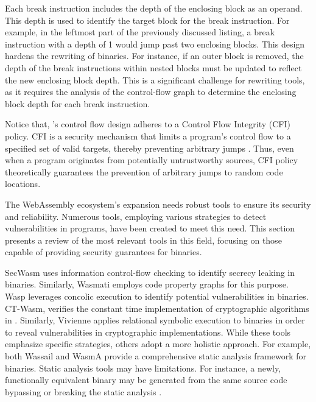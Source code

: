 

Each break instruction includes the depth of the enclosing block as an operand. 
This depth is used to identify the target block for the break instruction. 
For example, in the leftmost part of the previously discussed listing, a break instruction with a depth of 1 would jump past two enclosing blocks.
This design hardens the rewriting of \Wasm binaries.
For instance, if an outer block is removed, the depth of the break instructions within nested blocks must be updated to reflect the new enclosing block depth.
This is a significant challenge for rewriting tools, as it requires the analysis of the control-flow graph to determine the enclosing block depth for each break instruction.

Notice that, \Wasm's control flow design adheres to a Control Flow Integrity (CFI) policy. 
CFI is a security mechanism that limits a program's control flow to a specified set of valid targets, thereby preventing arbitrary jumps \cite{cfi}.
Thus, even when a \Wasm program originates from potentially untrustworthy sources, CFI policy theoretically guarantees the prevention of arbitrary jumps to random code locations.


\label{background:wasm:analysis}

The WebAssembly ecosystem's expansion needs robust tools to ensure its security and reliability. 
Numerous tools, employing various strategies to detect vulnerabilities in \Wasm programs, have been created to meet this need. 
This section presents a review of the most relevant tools in this field, focusing on those capable of providing security guarantees for \Wasm binaries.

 SecWasm\cite{secwasm} uses information control-flow checking to identify secrecy leaking in \Wasm binaries. 
Similarly, Wasmati\cite{wasmati} employs code property graphs for this purpose. 
Wasp\cite{Wasp} leverages concolic execution to identify potential vulnerabilities in \Wasm binaries. 
CT-Wasm\cite{ctwasm}, verifies the constant time implementation of cryptographic algorithms in \Wasm. 
Similarly, Vivienne applies relational symbolic execution to \Wasm binaries in order to reveal vulnerabilities in cryptographic implementations\cite{Vivienne}. 
While these tools emphasize specific strategies, others adopt a more holistic approach. 
For example, both Wassail\cite{wassail} and WasmA\cite{WasmA} provide a comprehensive static analysis framework for \Wasm binaries. 
Static analysis tools may have limitations. 
For instance, a newly, functionally equivalent \Wasm binary may be generated from the same source code bypassing or breaking the static analysis \cite{wasmixer}.

